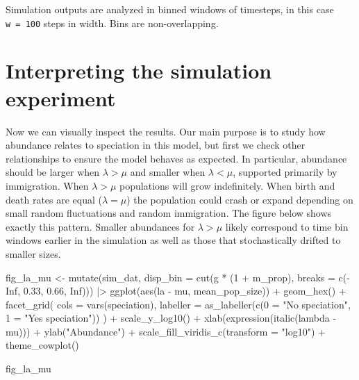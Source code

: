 \documentclass[
  letterpaper,
  DIV=11,
  numbers=noendperiod]{scrartcl}
\newenvironment{Shaded}{\begin{snugshade}}{\end{snugshade}}
\newcommand{\AttributeTok}[1]{\textcolor[rgb]{0.40,0.45,0.13}{#1}}
\newcommand{\ConstantTok}[1]{\textcolor[rgb]{0.56,0.35,0.01}{#1}}
\newcommand{\DecValTok}[1]{\textcolor[rgb]{0.68,0.00,0.00}{#1}}
\newcommand{\FloatTok}[1]{\textcolor[rgb]{0.68,0.00,0.00}{#1}}
\newcommand{\FunctionTok}[1]{\textcolor[rgb]{0.28,0.35,0.67}{#1}}
\newcommand{\NormalTok}[1]{\textcolor[rgb]{0.00,0.23,0.31}{#1}}
\newcommand{\OtherTok}[1]{\textcolor[rgb]{0.00,0.23,0.31}{#1}}
\newcommand{\SpecialCharTok}[1]{\textcolor[rgb]{0.37,0.37,0.37}{#1}}
\newcommand{\StringTok}[1]{\textcolor[rgb]{0.13,0.47,0.30}{#1}}
\begin{document}
Simulation outputs are analyzed in binned windows of timesteps, in this
case \texttt{w\ =\ 100} steps in width. Bins are non-overlapping.

\section{Interpreting the simulation experiment}\label{sec-sim-res}

Now we can visually inspect the results. Our main purpose is to study
how abundance relates to speciation in this model, but first we check
other relationships to ensure the model behaves as expected. In
particular, abundance should be larger when \(\lambda > \mu\) and
smaller when \(\lambda < \mu\), supported primarily by immigration. When
\(\lambda > \mu\) populations will grow indefinitely. When birth and
death rates are equal (\(\lambda = \mu\)) the population could crash or
expand depending on small random fluctuations and random immigration.
The figure below shows exactly this pattern. Smaller abundances for
\(\lambda > \mu\) likely correspond to time bin windows earlier in the
simulation as well as those that stochastically drifted to smaller
sizes.

\begin{Shaded}
\begin{Highlighting}[]
\NormalTok{fig\_la\_mu }\OtherTok{\textless{}{-}} \FunctionTok{mutate}\NormalTok{(sim\_dat, }
                    \AttributeTok{disp\_bin =} \FunctionTok{cut}\NormalTok{(g }\SpecialCharTok{*}\NormalTok{ (}\DecValTok{1} \SpecialCharTok{+}\NormalTok{ m\_prop), }
                                   \AttributeTok{breaks =} \FunctionTok{c}\NormalTok{(}\SpecialCharTok{{-}}\ConstantTok{Inf}\NormalTok{, }\FloatTok{0.33}\NormalTok{, }\FloatTok{0.66}\NormalTok{, }\ConstantTok{Inf}\NormalTok{))) }\SpecialCharTok{|\textgreater{}} 
    \FunctionTok{ggplot}\NormalTok{(}\FunctionTok{aes}\NormalTok{(la }\SpecialCharTok{{-}}\NormalTok{ mu, mean\_pop\_size)) }\SpecialCharTok{+}
    \FunctionTok{geom\_hex}\NormalTok{() }\SpecialCharTok{+}
    \FunctionTok{facet\_grid}\NormalTok{(}
        \AttributeTok{cols =} \FunctionTok{vars}\NormalTok{(speciation), }
        \AttributeTok{labeller =} \FunctionTok{as\_labeller}\NormalTok{(}\FunctionTok{c}\NormalTok{(}\StringTok{\textasciigrave{}}\AttributeTok{0}\StringTok{\textasciigrave{}} \OtherTok{=} \StringTok{"No speciation"}\NormalTok{,}
                                 \StringTok{\textasciigrave{}}\AttributeTok{1}\StringTok{\textasciigrave{}} \OtherTok{=} \StringTok{"Yes speciation"}\NormalTok{))}
\NormalTok{    ) }\SpecialCharTok{+}
    \FunctionTok{scale\_y\_log10}\NormalTok{() }\SpecialCharTok{+} 
    \FunctionTok{xlab}\NormalTok{(}\FunctionTok{expression}\NormalTok{(}\FunctionTok{italic}\NormalTok{(lambda }\SpecialCharTok{{-}}\NormalTok{ mu))) }\SpecialCharTok{+} 
    \FunctionTok{ylab}\NormalTok{(}\StringTok{"Abundance"}\NormalTok{) }\SpecialCharTok{+}
    \FunctionTok{scale\_fill\_viridis\_c}\NormalTok{(}\AttributeTok{transform =} \StringTok{"log10"}\NormalTok{) }\SpecialCharTok{+}
    \FunctionTok{theme\_cowplot}\NormalTok{()}

\NormalTok{fig\_la\_mu}
\end{Highlighting}
\end{Shaded}
\end{document}
